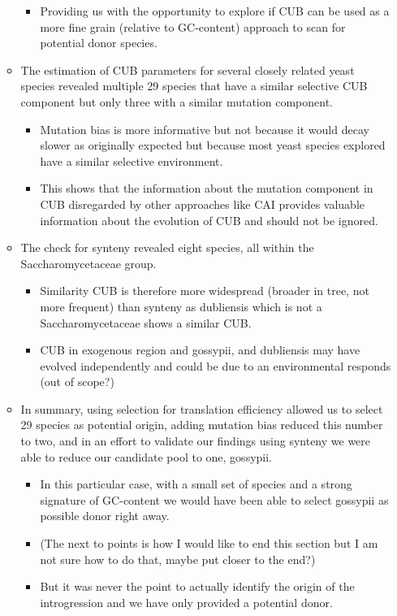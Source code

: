 \documentclass[12pt]{article}
\begin{document}
\begin{itemize}
\begin{itemize}
\begin{itemize}
			\item Providing us with the opportunity to explore if CUB can be used as a more fine grain (relative to GC-content) approach to scan for potential donor species.
		\end{itemize}
		\item The estimation of CUB parameters for several closely related yeast species revealed multiple 29 species that have a similar selective CUB component but only three with a similar mutation component.
		\begin{itemize}
			\item Mutation bias is more informative but not because it would decay slower as originally expected but because most yeast species explored have a similar selective environment.
			\item This shows that the information about the mutation component in CUB disregarded by other approaches like CAI provides valuable information about the evolution of CUB and should not be ignored.
		\end{itemize}
		\item The check for synteny revealed eight species, all within the Saccharomycetaceae group.
		\begin{itemize}
			\item Similarity CUB is therefore more widespread (broader in tree, not more frequent) than synteny as dubliensis which is not a Saccharomycetaceae shows a similar CUB.
			\item CUB in exogenous region and gossypii, and dubliensis may have evolved independently and could be due to an environmental responds (out of scope?) 
		\end{itemize} 
		\item In summary, using selection for translation efficiency allowed us to select 29 species as potential origin, adding mutation bias reduced this number to two, and in an effort to validate our findings using synteny we were able to reduce our candidate pool to one, gossypii. 
		\begin{itemize}
			\item In this particular case, with a small set of species and a strong signature of GC-content we would have been able to select gossypii as possible donor right away.
			\item (The next to points is how I would like to end this section but I am not sure how to do that, maybe put closer to the end?)
			\item But it was never the point to actually identify the origin of the introgression and we have only provided a potential donor.

\end{itemize}
\end{itemize}
\end{itemize}
\end{document}
